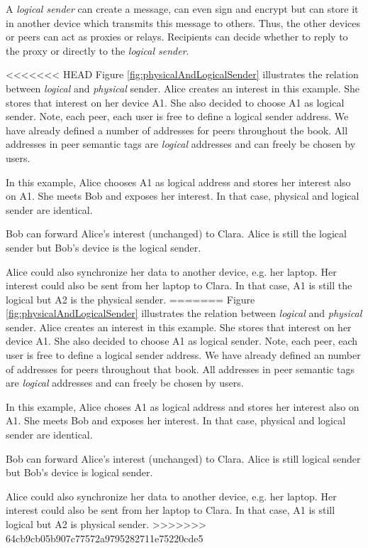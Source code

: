 A {\it logical sender} can create a message, can even sign and encrypt but can store it in another device which transmits this message to others. Thus, the other devices or peers can act as proxies or relays. Recipients can decide whether to reply to the proxy or directly to the {\it logical sender}. 

<<<<<<< HEAD
Figure \ref{fig:physicalAndLogicalSender} illustrates the relation between {\it logical} and {\it physical} sender. Alice creates an interest in this example. She stores that interest on her device A1. She also decided to choose A1 as logical sender. Note, each peer, each user is free to define a logical sender address. We have already defined a number of addresses for peers throughout the book. All addresses in peer semantic tags are {\it logical} addresses and can freely be chosen by users.

In this example, Alice chooses A1 as logical address and stores her interest also on A1. She meets Bob and exposes her interest. In that case, physical and logical sender are identical.

Bob can forward Alice's interest (unchanged) to Clara. Alice is still the logical sender but Bob's device is the logical sender. 

Alice could also synchronize her data to another device, e.g. her laptop. Her interest could also be sent from her laptop to Clara. In that case, A1 is still the logical but A2 is the physical sender.
=======
Figure \ref{fig:physicalAndLogicalSender} illustrates the relation between {\it logical} and {\it physical} sender. Alice creates an interest in this example. She stores that interest on her device A1. She also decided to choose A1 as logical sender. Note, each peer, each user is free to define a logical sender address. We have already defined an number of addresses for peers throughout that book. All addresses in peer semantic tags are {\it logical} addresses and can freely be chosen by users.

In this example, Alice choses A1 as logical address and stores her interest also on A1. She meets Bob and exposes her interest. In that case, physical and logical sender are identical.

Bob can forward Alice's interest (unchanged) to Clara. Alice is still logical sender but Bob's device is logical sender. 

Alice could also synchronize her data to another device, e.g. her laptop. Her interest could also be sent from her laptop to Clara. In that case, A1 is still logical but A2 is physical sender.
>>>>>>> 64cb9cb05b907c77572a9795282711e75220cde5

